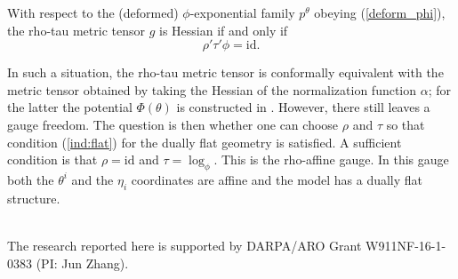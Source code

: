 \documentclass[graybox]{svmult}
\newcommand{\id}{\mbox{id}}
\begin{document}
\begin{theorem}
With respect to the (deformed) $\phi$-exponential family $p^\theta$ obeying  (\ref{deform_phi}), the rho-tau metric tensor $g$ is Hessian if and only if 
$$
\rho'\tau'\phi=\id .
$$ 
\end{theorem}
  
In such a situation,  the rho-tau metric tensor is conformally equivalent
with the metric tensor obtained by taking the Hessian of the normalization
function $\alpha$; for the latter the potential $\Phi(\theta)$ is constructed in \cite{NJ04}. However, there still leaves a gauge freedom. The question is then whether one can choose $\rho$ and $\tau$ so that condition 
(\ref {ind:flat}) for the dually flat geometry is satisfied.
A sufficient condition is that $\rho=\id$ and $\tau=\log_\phi$. This is the rho-affine gauge. In this gauge both the $\theta^i$ and the $\eta_i$ coordinates are affine and the model has a dually flat structure.

\vspace{0.1cm}

 \\
The research reported here is supported by DARPA/ARO Grant W911NF-16-1-0383 (PI: Jun Zhang). 
\end{document}
